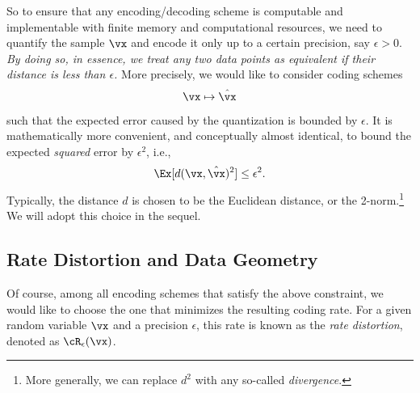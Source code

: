 \documentclass[../../book-main.tex]{subfiles}
\begin{document}
So to ensure that any encoding/decoding scheme is computable and implementable
with finite memory and computational resources, we need to quantify
the sample $\vx$ and encode it only up to a certain precision, say
$\epsilon > 0$. {\em By doing so, in essence, we treat any two data
points as equivalent if their distance is less than $\epsilon$.} More
precisely, we would like to consider coding schemes
\begin{equation}
    \vx \mapsto \hat \vx
\end{equation}
such that the expected error caused by the quantization is bounded by
$\epsilon$. It is mathematically more convenient, and conceptually
almost identical, to bound the expected \textit{squared} error by
\(\epsilon^{2}\), i.e.,
\begin{equation}
    \Ex[d(\vx, \hat \vx)^{2}] \le \epsilon^{2}.
\end{equation}
Typically, the distance \(d\) is chosen to be the Euclidean distance, or the
2-norm.\footnote{More generally, we can replace \(d^{2}\) with any so-called
\textit{divergence}.} We will adopt this choice in the sequel.

\subsection{Rate Distortion and Data Geometry}
Of course, among all encoding schemes that satisfy the above constraint, we
would like to choose the one that minimizes the resulting coding rate. For
a given random variable $\vx$ and a precision $\epsilon$, this rate is known as
the \textit{rate distortion}, denoted as $\cR_{\epsilon}(\vx)$.
\end{document}
